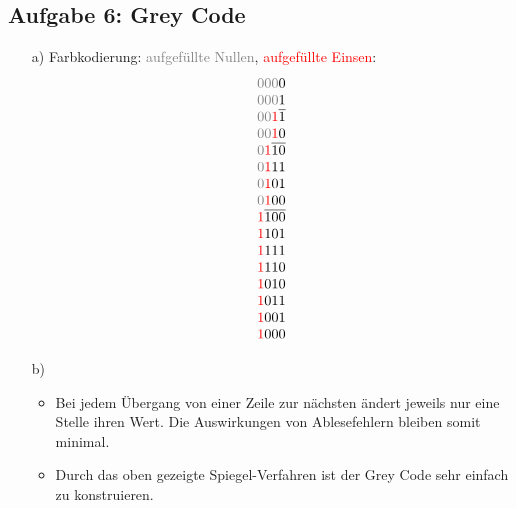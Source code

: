\documentclass{article}
\begin{document}
	\subsection*{Aufgabe 6: Grey Code}
	\begin{enumerate}
		\item[a)] Farbkodierung: \textcolor{gray}{aufgefüllte Nullen}, \textcolor{red}{aufgefüllte Einsen}:
		\[\setlength{\arraycolsep}{0pt}
		\begin{array}{*{4}{c}}
			\textcolor{gray}{0} & \textcolor{gray}{0} & \textcolor{gray}{0} & 0 \\ 
			\textcolor{gray}{0} & \textcolor{gray}{0} & \textcolor{gray}{0} & 1 \\ \cline{4-4}
			\textcolor{gray}{0} & \textcolor{gray}{0} & \textcolor{red}{1} & 1 \\ 
			\textcolor{gray}{0} & \textcolor{gray}{0} & \textcolor{red}{1} & 0 \\ \cline{3-4}
			\textcolor{gray}{0} & \textcolor{red}{1} & 1 & 0 \\
			\textcolor{gray}{0} & \textcolor{red}{1} & 1 & 1 \\ 
			\textcolor{gray}{0} & \textcolor{red}{1} & 0 & 1 \\
			\textcolor{gray}{0} & \textcolor{red}{1} & 0 & 0 \\ \cline{2-4}
			\textcolor{red}{1} & 1 & 0 & 0 \\
			\textcolor{red}{1} & 1 & 0 & 1 \\
			\textcolor{red}{1} & 1 & 1 & 1 \\
			\textcolor{red}{1} & 1 & 1 & 0 \\
			\textcolor{red}{1} & 0 & 1 & 0 \\
			\textcolor{red}{1} & 0 & 1 & 1 \\
			\textcolor{red}{1} & 0 & 0 & 1 \\
			\textcolor{red}{1} & 0 & 0 & 0 
		\end{array}
		\] 
		\item[b)]
		\begin{itemize}
			\item Bei jedem Übergang von einer Zeile zur nächsten ändert jeweils nur eine Stelle ihren Wert. Die Auswirkungen von Ablesefehlern bleiben somit minimal.
			\item Durch das oben gezeigte Spiegel-Verfahren ist der Grey Code sehr einfach zu konstruieren. 
		\end{itemize}
	\end{enumerate}
\end{document}
